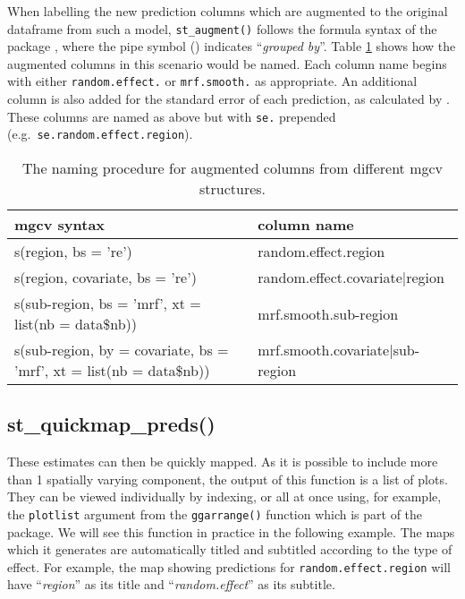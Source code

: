 When labelling the new prediction columns which are augmented to the original dataframe from such a model, \texttt{st\_augment()} follows the formula syntax of the  package \citep{lme4}, where the pipe symbol (\texttt{\textbar{}}) indicates ``\emph{grouped by}''. Table \ref{tab:staugtab-latex} shows how the augmented columns in this scenario would be named. Each column name begins with either \texttt{random.effect.} or \texttt{mrf.smooth.} as appropriate. An additional column is also added for the standard error of each prediction, as calculated by . These columns are named as above but with \texttt{se.} prepended (e.g.~\texttt{se.random.effect.region}).

\begin{table}
\centering
\caption{\label{tab:staugtab-latex}The naming procedure for augmented columns from different mgcv structures.}
\centering
\fontsize{9}{11}\selectfont
\begin{tabular}[t]{l|l}
\hline
\textbf{mgcv syntax} & \textbf{column name}\\
\hline
s(region, bs = 're') & random.effect.region\\
\hline
s(region, covariate, bs = 're') & random.effect.covariate|region\\
\hline
s(sub-region, bs = 'mrf', xt = list(nb = data\$nb)) & mrf.smooth.sub-region\\
\hline
s(sub-region, by = covariate, bs = 'mrf', xt = list(nb = data\$nb)) & mrf.smooth.covariate|sub-region\\
\hline
\end{tabular}
\end{table}

\subsection{st\_quickmap\_preds()}\label{st_quickmap_preds}

These estimates can then be quickly mapped. As it is possible to include more than 1 spatially varying component, the output of this function is a list of plots. They can be viewed individually by indexing, or all at once using, for example, the \texttt{plotlist} argument from the \texttt{ggarrange()} function which is part of the  \citep{ggpubr} package. We will see this function in practice in the following example. The maps which it generates are automatically titled and subtitled according to the type of effect. For example, the map showing predictions for \texttt{random.effect.region} will have ``\emph{region}'' as its title and ``\emph{random.effect}'' as its subtitle.

